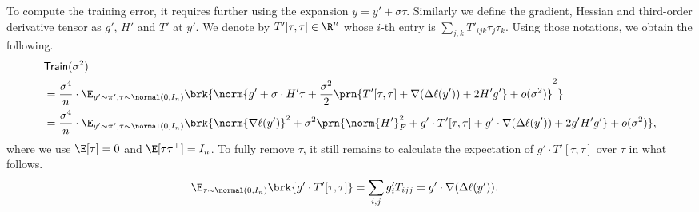 \documentclass[11pt]{article}
\newcommand{\bysest}{\what{\theta}_{\mathsf{B}}}
\newcommand{\trerr}{\mathsf{Train}}
\newcommand{\de}{\mathrm{d}}
\begin{document}
To compute the training error, it requires further using the expansion $y=y' + \sigma \tau$. Similarly we define the gradient, Hessian and third-order derivative tensor as $g'$, $H'$ and $T'$ at $y'$. We denote by $T'[\tau, \tau] \in \R^n$ whose $i$-th entry is $\sum_{j,k} T'_{ijk} \tau_j \tau_k$. Using those notations, we obtain the following.
\begin{align*}
    &\trerr(\sigma^2) \nonumber \\
    &= \frac{\sigma^4}{n} \cdot \E_{y' \sim \pi', \tau \sim \normal(0, I_n)} \brk{\norm{ g' + \sigma \cdot H' \tau + \frac{\sigma^2}{2} \prn{T'[\tau, \tau] + \nabla (\Delta \ell(y')) + 2 H' g' } + o(\sigma^2)}^2} \\
    & = \frac{\sigma^4}{n} \cdot  \E_{y' \sim \pi', \tau \sim \normal(0, I_n)} \brk{ \norm{ \nabla \ell (y') }^2 + \sigma^2 \prn{\norm{H'}_F^2 + g' \cdot T'[\tau, \tau]+ g' \cdot \nabla(\Delta \ell(y')) + 2 g'H'g'} + o(\sigma^2)},
\end{align*}
where we use $\E[\tau] = 0$ and $\E[\tau \tau^\top] = I_n$. To fully remove $\tau$, it still remains to calculate the expectation of $g' \cdot T'[\tau, \tau]$ over $\tau$ in what follows.
\begin{align*}
    \E_{\tau \sim \normal(0, I_n)} \brk{g' \cdot T'[\tau, \tau]} &= \sum_{i,j} g'_i T_{ijj} = g' \cdot \nabla(\Delta \ell(y')).
\end{align*}
\end{document}
